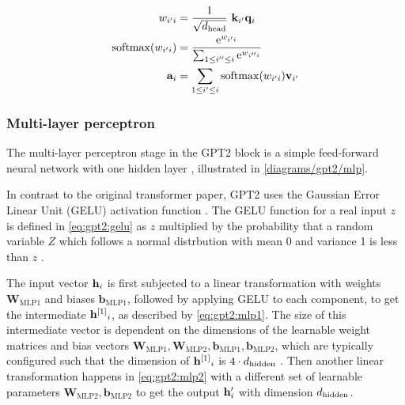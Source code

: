 \begin{align}
	w_{i'i} &= \frac{1}{\sqrt{{d_\textrm{head}}}} \ \mathbf{k}_{i'} \mathbf{q}_i
	\label{eq:attn_dot_weight}
	\\
	\operatorname{softmax}(w_{i'i}) &= \frac{\mathrm{e}^{w_{i'i}}} {\sum_{1 \leq i'' \leq i} \mathrm{e}^{w_{i''i}} }
	\label{eq:attn_dot_softmax}
	\\
	\mathbf{a}_i &= \sum _{1 \leq i' \leq i} \operatorname{softmax}(w_{i'i}) \mathbf{v}_{i'}
	\label{eq:attn_dot_out}
\end{align}



\subsubsection{Multi-layer perceptron}
\label{gpt2:mlp}


The multi-layer perceptron stage in the GPT2 block is a simple feed-forward neural network with one hidden layer , illustrated in \cref{diagrams/gpt2/mlp}.

In contrast to the original transformer paper, GPT2 uses the Gaussian Error Linear Unit (GELU) activation function .
The GELU function for a real input $z$ is defined in \cref{eq:gpt2:gelu} as $z$ multiplied by the probability that a random variable $Z$ which follows a normal distrbution with mean 0 and variance 1 is less than $z$ \cite{gelu}.

The input vector ${\mathbf{h}}_i$ is first subjected to a linear transformation with weights $\mathbf{W}_\textrm{MLP1}$ and biases $\mathbf{b}_\textrm{MLP1}$, followed by applying GELU to each component, to get the intermediate ${{\mathbf{h}}^{[1]}}_i$, as described by \cref{eq:gpt2:mlp1}. The size of this intermediate vector is dependent on the dimensions of the learnable weight matrices and bias vectors $\mathbf{W}_\textrm{MLP1}, \mathbf{W}_\textrm{MLP2}, \mathbf{b}_\textrm{MLP1}, \mathbf{b}_\textrm{MLP2}$, which are typically configured such that the dimension of ${{\mathbf{h}}^{[1]}}_i$ is $4 \cdot {d_\textrm{hidden}}$  \cite[source code]{HuggingFaceGPT2}.
Then another linear transformation happens in \cref{eq:gpt2:mlp2} with a different set of learnable parameters $\mathbf{W}_\textrm{MLP2}, \mathbf{b}_\textrm{MLP2}$ to get the output ${\mathbf{h}}'_i$ with dimension ${d_\textrm{hidden}}$.

